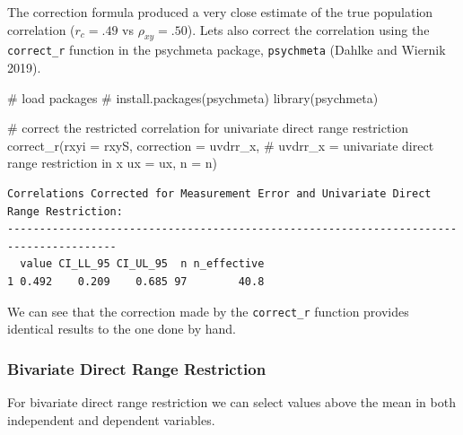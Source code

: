 \documentclass[
  letterpaper,
  DIV=11,
  numbers=noendperiod]{scrreprt}
\newenvironment{Shaded}{\begin{snugshade}}{\end{snugshade}}
\newcommand{\AttributeTok}[1]{\textcolor[rgb]{0.40,0.45,0.13}{#1}}
\newcommand{\CommentTok}[1]{\textcolor[rgb]{0.37,0.37,0.37}{#1}}
\newcommand{\FunctionTok}[1]{\textcolor[rgb]{0.28,0.35,0.67}{#1}}
\newcommand{\NormalTok}[1]{\textcolor[rgb]{0.00,0.23,0.31}{#1}}
\newcommand{\StringTok}[1]{\textcolor[rgb]{0.13,0.47,0.30}{#1}}
\begin{document}
The correction formula produced a very close estimate of the true
population correlation (\(r_c = .49\) vs \(\rho_{xy}=.50\)). Lets also
correct the correlation using the \texttt{correct\_r} function in the
psychmeta package, \texttt{psychmeta} (Dahlke and Wiernik 2019).

\begin{Shaded}
\begin{Highlighting}[]
\CommentTok{\# load packages}
\CommentTok{\# install.packages(\textquotesingle{}psychmeta\textquotesingle{})}
\FunctionTok{library}\NormalTok{(psychmeta)}

\CommentTok{\# correct the restricted correlation for univariate direct range restriction}
\FunctionTok{correct\_r}\NormalTok{(}\AttributeTok{rxyi =}\NormalTok{ rxyS,}
          \AttributeTok{correction =} \StringTok{\textquotesingle{}uvdrr\_x\textquotesingle{}}\NormalTok{,  }\CommentTok{\# uvdrr\_x = univariate direct range restriction in x}
          \AttributeTok{ux =}\NormalTok{ ux,}
          \AttributeTok{n =}\NormalTok{ n)}
\end{Highlighting}
\end{Shaded}

\begin{verbatim}
Correlations Corrected for Measurement Error and Univariate Direct Range Restriction:
---------------------------------------------------------------------------------------
  value CI_LL_95 CI_UL_95  n n_effective
1 0.492    0.209    0.685 97        40.8
\end{verbatim}

We can see that the correction made by the \texttt{correct\_r} function
provides identical results to the one done by hand.

\hypertarget{bivariate-direct-range-restriction}{%
\subsubsection{Bivariate Direct Range
Restriction}\label{bivariate-direct-range-restriction}}

For bivariate direct range restriction we can select values above the
mean in both independent and dependent variables.
\end{document}
